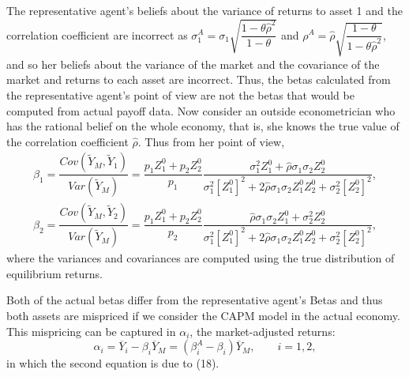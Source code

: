 \documentclass[10pt]{article}
\begin{document}
The representative agent's beliefs about the variance of returns to asset 1 and the correlation coefficient are incorrect as $\sigma_1^A = \sigma_1 \sqrt{\dfrac{1 - \theta \hat{\rho}^2}{1 - \theta}} $ and $ \rho^A = \hat{\rho} \sqrt{\dfrac{1 - \theta}{1 - \theta \hat{\rho}^2}} $, and so her beliefs about the variance of the market and the covariance of the market and returns to each asset are incorrect. Thus, the betas calculated from the representative agent's point of view are not the betas that would be computed from actual payoff data. Now consider an outside econometrician who has the rational belief on the whole economy, that is, she knows the true value of the correlation coefficient $ \hat{\rho} $. Thus from her point of view, 
\begin{eqnarray*}
& \beta_1 = \dfrac{Cov (\tilde{Y}_M, \tilde{Y}_1)}{Var (\tilde{Y}_M)} = \dfrac{p_1 Z_1^0 + p_2 Z_2^0}{p_1} \dfrac{\sigma_1^2 Z_1^0 + \hat{\rho} \sigma_1 \sigma_2 Z_2^0}{\sigma_1^2 \left[ Z_1^0 \right]^2 + 2 \hat{\rho} \sigma_1 \sigma_2 Z_1^0 Z_2^0 + \sigma_2^2 \left[ Z_2^0 \right]^2}, & \\
& \beta_2 = \dfrac{Cov (\tilde{Y}_M, \tilde{Y}_2)}{Var (\tilde{Y}_M)} = \dfrac{p_1 Z_1^0 + p_2 Z_2^0}{p_2} \dfrac{\hat{\rho} \sigma_1 \sigma_2 Z_1^0 + \sigma_2^2 Z_2^0}{\sigma_1^2 \left[ Z_1^0 \right]^2 + 2 \hat{\rho} \sigma_1 \sigma_2 Z_1^0 Z_2^0 + \sigma_2^2 \left[ Z_2^0 \right]^2}, &
\end{eqnarray*}
where the variances and covariances are computed using the true distribution of equilibrium returns.

Both of the actual betas differ from the representative agent's Betas and thus both assets are mispriced if we consider the CAPM model in the actual economy. This mispricing can be captured in $ \alpha_i $, the market-adjusted returns:
\begin{equation*}
\alpha_i = \overline{Y}_i - \beta_i \overline{Y}_M = (\beta_i^A - \beta_i) \overline{Y}_M, \qquad i = 1, 2, 
\end{equation*}
in which the second equation is due to (18).
\end{document}
